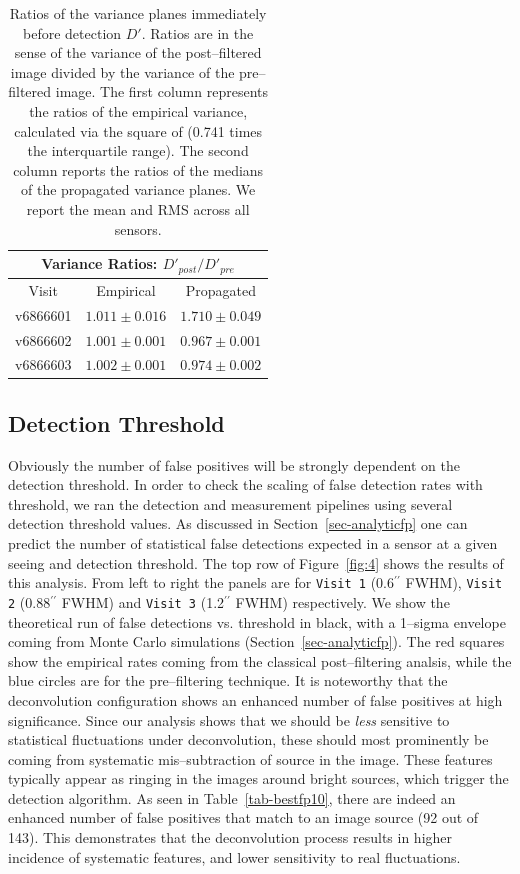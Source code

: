 \documentclass[floatfix, apj]{emulateapj}
\begin{document}
\begin{table}[t]
\centering
\begin{tabular}{ccc}
\hline
\multicolumn{3}{|c|}{Variance Ratios: $D'_{post} / D'_{pre}$} \\
\hline
Visit    & Empirical & Propagated \\
\hline
v6866601 & $1.011 \pm 0.016$    & $1.710 \pm 0.049$    \\
v6866602 & $1.001 \pm 0.001$    & $0.967 \pm 0.001$    \\
v6866603 & $1.002 \pm 0.001$    & $0.974 \pm 0.002$    \\
\end{tabular}
\caption{{\rm Ratios of the variance planes immediately before detection $D'$.
  Ratios are in the sense of the variance of the post--filtered image divided by the variance of the pre--filtered image.
  The first column represents the ratios of the empirical variance, calculated via the square of (0.741 times the interquartile range).
  The second column reports the ratios of the medians of the propagated variance planes.
  We report the mean and RMS across all sensors.
\label{tab-variance2}}}
\end{table}


\subsection{Detection Threshold}
Obviously the number of false positives will be strongly dependent on the detection threshold.
In order to check the scaling of false detection rates with threshold, we ran the detection and measurement pipelines using several detection threshold values.
As discussed in Section~\ref{sec-analyticfp} one can predict the number of statistical false detections expected in a sensor at a given seeing and detection threshold.
The top row of Figure~\ref{fig:4} shows the results of this analysis.
From left to right the panels are for {\tt Visit 1} (0.6$^{\prime\prime}$ FWHM), {\tt Visit 2} (0.88$^{\prime\prime}$ FWHM) and {\tt Visit 3} (1.2$^{\prime\prime}$ FWHM) respectively.
We show the theoretical run of false detections vs. threshold in black, with a 1--sigma envelope coming from Monte Carlo simulations (Section~\ref{sec-analyticfp}).
The red squares show the empirical rates coming from the classical post--filtering analsis, while the blue circles are for the pre--filtering technique.
It is noteworthy that the deconvolution configuration shows an enhanced number of false positives at high significance.
Since our analysis shows that we should be {\it less} sensitive to statistical fluctuations under deconvolution, these should most prominently be coming from systematic mis--subtraction of source in the image.
These features typically appear as ringing in the images around bright sources, which trigger the detection algorithm.
As seen in Table~\ref{tab-bestfp10}, there are indeed an enhanced number of false positives that match to an image source (92 out of 143).
This demonstrates that the deconvolution process results in higher incidence of systematic features, and lower sensitivity to real fluctuations.
\end{document}
